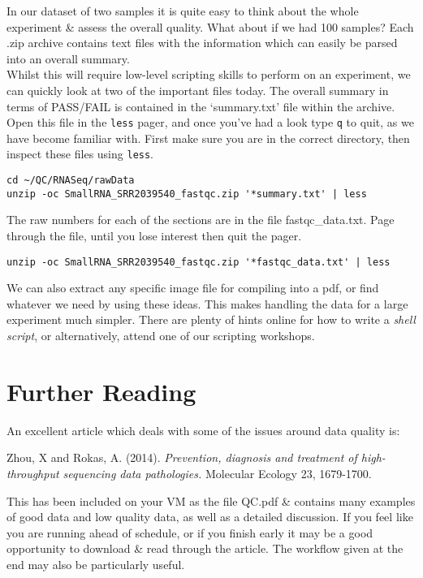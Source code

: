 \begin{advanced}
In our dataset of two samples it is quite easy to think about the whole experiment \& assess the overall quality.
What about if we had 100 samples?
Each .zip archive contains text files with the information which can easily be parsed into an overall summary. \\

Whilst this will require low-level scripting skills to perform on an experiment, we can quickly look at two of the important files today.
The overall summary in terms of PASS/FAIL is contained in the `summary.txt' file within the archive.
Open this file in the \texttt{less} pager, and once you've had a look type \texttt{q} to quit, as we have become familiar with.
First make sure you are in the correct directory, then inspect these files using \texttt{less}.
\begin{lstlisting}
cd ~/QC/RNASeq/rawData
unzip -oc SmallRNA_SRR2039540_fastqc.zip '*summary.txt' | less
\end{lstlisting}

The raw numbers for each of the sections are in the file fastqc\_data.txt.
Page through the file, until you lose interest then quit the pager.
\begin{lstlisting}
unzip -oc SmallRNA_SRR2039540_fastqc.zip '*fastqc_data.txt' | less
\end{lstlisting}

We can also extract any specific image file for compiling into a pdf, or find whatever we need by using these ideas.
This makes handling the data for a large experiment much simpler.
There are plenty of hints online for how to write a \textit{shell script}, or alternatively, attend one of our scripting workshops.
\end{advanced}

\section{Further Reading}
An excellent article which deals with some of the issues around data quality is:

Zhou, X and Rokas, A. (2014). \textit{Prevention, diagnosis and treatment of high-throughput sequencing data pathologies.} Molecular Ecology 23, 1679-1700.

This has been included on your VM as the file QC.pdf \& contains many examples of good data and low quality data, as well as a detailed discussion.
If you feel like you are running ahead of schedule, or if you finish early it may be a good opportunity to download \& read through the article.
The workflow given at the end may also be particularly useful.
